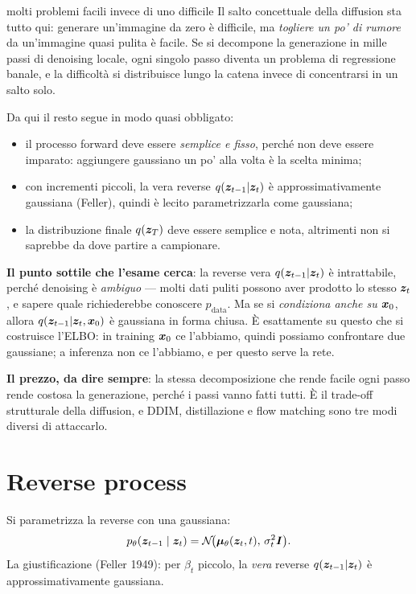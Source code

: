 \begin{intuizione}{molti problemi facili invece di uno difficile}
Il salto concettuale della diffusion sta tutto qui: generare un'immagine da zero è difficile, ma \emph{togliere un po' di rumore} da un'immagine quasi pulita è facile. Se si decompone la generazione in mille passi di denoising locale, ogni singolo passo diventa un problema di regressione banale, e la difficoltà si distribuisce lungo la catena invece di concentrarsi in un salto solo.

Da qui il resto segue in modo quasi obbligato:
\begin{itemize}[leftmargin=1.4em]
  \item il processo forward deve essere \emph{semplice e fisso}, perché non deve essere imparato: aggiungere gaussiano un po' alla volta è la scelta minima;
  \item con incrementi piccoli, la vera reverse $q(\bm{z}_{t-1}|\bm{z}_t)$ è approssimativamente gaussiana (Feller), quindi è lecito parametrizzarla come gaussiana;
  \item la distribuzione finale $q(\bm{z}_T)$ deve essere semplice e nota, altrimenti non si saprebbe da dove partire a campionare.
\end{itemize}

\textbf{Il punto sottile che l'esame cerca}: la reverse vera $q(\bm{z}_{t-1}|\bm{z}_t)$ è intrattabile, perché denoising è \emph{ambiguo} — molti dati puliti possono aver prodotto lo stesso $\bm{z}_t$, e sapere quale richiederebbe conoscere $p_{\text{data}}$. Ma se si \emph{condiziona anche su $\bm{x}_0$}, allora $q(\bm{z}_{t-1}|\bm{z}_t, \bm{x}_0)$ è gaussiana in forma chiusa. È esattamente su questo che si costruisce l'ELBO: in training $\bm{x}_0$ ce l'abbiamo, quindi possiamo confrontare due gaussiane; a inferenza non ce l'abbiamo, e per questo serve la rete.

\textbf{Il prezzo, da dire sempre}: la stessa decomposizione che rende facile ogni passo rende costosa la generazione, perché i passi vanno fatti tutti. È il trade-off strutturale della diffusion, e DDIM, distillazione e flow matching sono tre modi diversi di attaccarlo.
\end{intuizione}

\section{Reverse process}

Si parametrizza la reverse con una gaussiana:
\[
p_\theta(\bm{z}_{t-1} \mid \bm{z}_t) = \mathcal{N}\!\big(\boldsymbol{\mu}_\theta(\bm{z}_t, t),\, \sigma_t^2 \bm{I}\big).
\]
La giustificazione (Feller 1949): per $\beta_t$ piccolo, la \emph{vera} reverse $q(\bm{z}_{t-1}|\bm{z}_t)$ è approssimativamente gaussiana.

